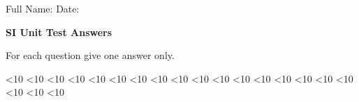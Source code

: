 
\usepackage[english]{babel}







Full Name:
\raisebox{-2pt}{\rule[-.4ex]{5cm}{.4pt}}\hfill
Date: 
\raisebox{-2pt}{\rule[-.4ex]{3cm}{.4pt}}
\hspace*{.5cm}%


\vspace{6mm}
\textbf{\large SI Unit Test \ifprintanswers \hfill \textcolor{AccentColor}{Answers}
\fi
}%
\vspace{3mm}


For each question give one answer only.



\ifnum\theexerciseID<10 {}  \fi%
\ifnum\theexerciseID<10 {}  \fi%
\ifnum\theexerciseID<10 {}  \fi%
\ifnum\theexerciseID<10 {}  \fi%
\ifnum\theexerciseID<10 {}  \fi%
\ifnum\theexerciseID<10 {}  \fi%
\ifnum\theexerciseID<10 {}  \fi%
\ifnum\theexerciseID<10 {}  \fi%
\ifnum\theexerciseID<10 {}  \fi%
\ifnum\theexerciseID<10 {} \fi%
\ifnum\theexerciseID<10 {} \fi%
\ifnum\theexerciseID<10 {} \fi%
\ifnum\theexerciseID<10 {} \fi%
\ifnum\theexerciseID<10 {} \fi%
\ifnum\theexerciseID<10 {} \fi%
\ifnum\theexerciseID<10 {} \fi%
\ifnum\theexerciseID<10 {} \fi%
\ifnum\theexerciseID<10 {} \fi%
\ifnum\theexerciseID<10 {} \fi%
\ifnum\theexerciseID<10 {} \fi%



